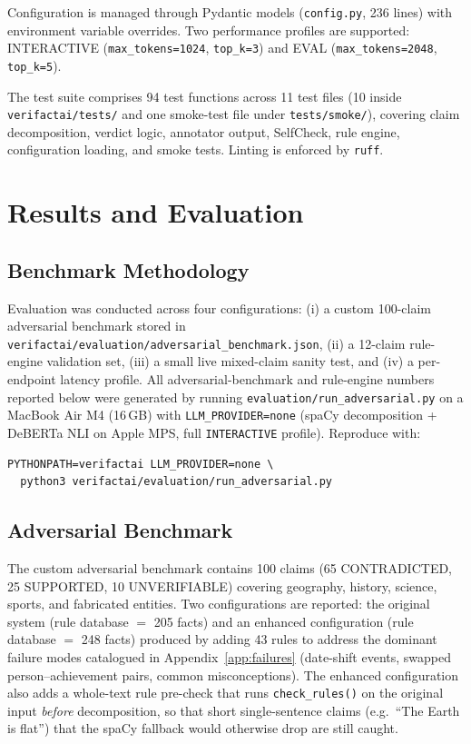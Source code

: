 \documentclass[12pt, a4paper, oneside]{report}
\begin{document}
Configuration is managed through Pydantic models (\texttt{config.py}, 236 lines) with environment variable overrides. Two performance profiles are supported: INTERACTIVE (\texttt{max\_tokens=1024}, \texttt{top\_k=3}) and EVAL (\texttt{max\_tokens=2048}, \texttt{top\_k=5}).

The test suite comprises 94 test functions across 11 test files (10 inside \texttt{verifactai/tests/} and one smoke-test file under \texttt{tests/smoke/}), covering claim decomposition, verdict logic, annotator output, SelfCheck, rule engine, configuration loading, and smoke tests. Linting is enforced by \texttt{ruff}.

\chapter{Results and Evaluation}
\label{ch:results}

\section{Benchmark Methodology}

Evaluation was conducted across four configurations: (i) a custom 100-claim adversarial benchmark stored in \texttt{verifactai/evaluation/adversarial\_benchmark.json}, (ii) a 12-claim rule-engine validation set, (iii) a small live mixed-claim sanity test, and (iv) a per-endpoint latency profile. All adversarial-benchmark and rule-engine numbers reported below were generated by running \texttt{evaluation/run\_adversarial.py} on a MacBook Air M4 (16\,GB) with \texttt{LLM\_PROVIDER=none} (spaCy decomposition + DeBERTa NLI on Apple MPS, full \texttt{INTERACTIVE} profile). Reproduce with:

\begin{lstlisting}[style=jsonstyle, caption={Reproducing the adversarial benchmark.}]
PYTHONPATH=verifactai LLM_PROVIDER=none \
  python3 verifactai/evaluation/run_adversarial.py
\end{lstlisting}

\section{Adversarial Benchmark}

The custom adversarial benchmark contains 100 claims (65 CONTRADICTED, 25 SUPPORTED, 10 UNVERIFIABLE) covering geography, history, science, sports, and fabricated entities. Two configurations are reported: the original system (rule database $=$ 205 facts) and an enhanced configuration (rule database $=$ 248 facts) produced by adding 43 rules to address the dominant failure modes catalogued in Appendix~\ref{app:failures} (date-shift events, swapped person--achievement pairs, common misconceptions). The enhanced configuration also adds a whole-text rule pre-check that runs \texttt{check\_rules()} on the original input \emph{before} decomposition, so that short single-sentence claims (e.g.\ ``The Earth is flat'') that the spaCy fallback would otherwise drop are still caught.
\end{document}
